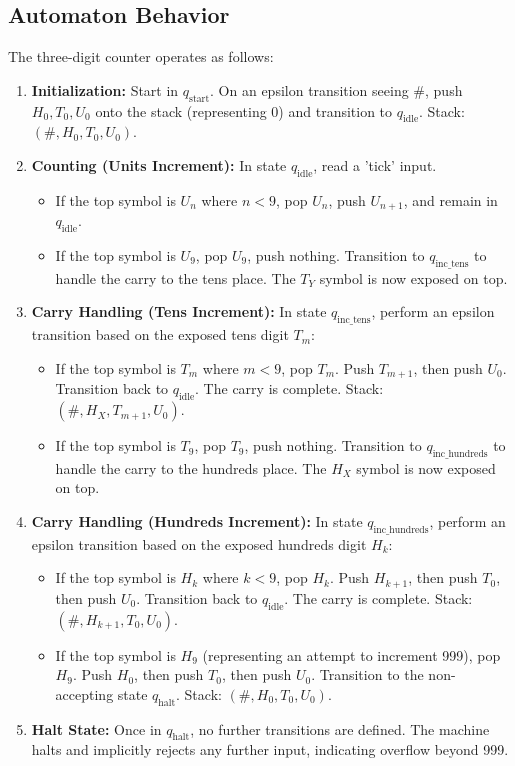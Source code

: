 \documentclass[11pt]{article}
\begin{document}
\subsection{Automaton Behavior}
The three-digit counter operates as follows:
\begin{enumerate}
    \item \textbf{Initialization:} Start in $q_{\text{start}}$. On an epsilon transition seeing $\#$, push $H_0, T_0, U_0$ onto the stack (representing 0) and transition to $q_{\text{idle}}$. Stack: $(\#, H_0, T_0, U_0)$.
    \item \textbf{Counting (Units Increment):} In state $q_{\text{idle}}$, read a 'tick' input.
        \begin{itemize}
            \item If the top symbol is $U_n$ where $n < 9$, pop $U_n$, push $U_{n+1}$, and remain in $q_{\text{idle}}$.
            \item If the top symbol is $U_9$, pop $U_9$, push nothing. Transition to $q_{\text{inc\_tens}}$ to handle the carry to the tens place. The $T_Y$ symbol is now exposed on top.
        \end{itemize}
    \item \textbf{Carry Handling (Tens Increment):} In state $q_{\text{inc\_tens}}$, perform an epsilon transition based on the exposed tens digit $T_m$:
        \begin{itemize}
            \item If the top symbol is $T_m$ where $m < 9$, pop $T_m$. Push $T_{m+1}$, then push $U_0$. Transition back to $q_{\text{idle}}$. The carry is complete. Stack: $(\#, H_X, T_{m+1}, U_0)$.
            \item If the top symbol is $T_9$, pop $T_9$, push nothing. Transition to $q_{\text{inc\_hundreds}}$ to handle the carry to the hundreds place. The $H_X$ symbol is now exposed on top.
        \end{itemize}
    \item \textbf{Carry Handling (Hundreds Increment):} In state $q_{\text{inc\_hundreds}}$, perform an epsilon transition based on the exposed hundreds digit $H_k$:
        \begin{itemize}
            \item If the top symbol is $H_k$ where $k < 9$, pop $H_k$. Push $H_{k+1}$, then push $T_0$, then push $U_0$. Transition back to $q_{\text{idle}}$. The carry is complete. Stack: $(\#, H_{k+1}, T_0, U_0)$.
            \item If the top symbol is $H_9$ (representing an attempt to increment 999), pop $H_9$. Push $H_0$, then push $T_0$, then push $U_0$. Transition to the non-accepting state $q_{\text{halt}}$. Stack: $(\#, H_0, T_0, U_0)$.
        \end{itemize}
     \item \textbf{Halt State:} Once in $q_{\text{halt}}$, no further transitions are defined. The machine halts and implicitly rejects any further input, indicating overflow beyond 999.
\end{enumerate}
\end{document}
